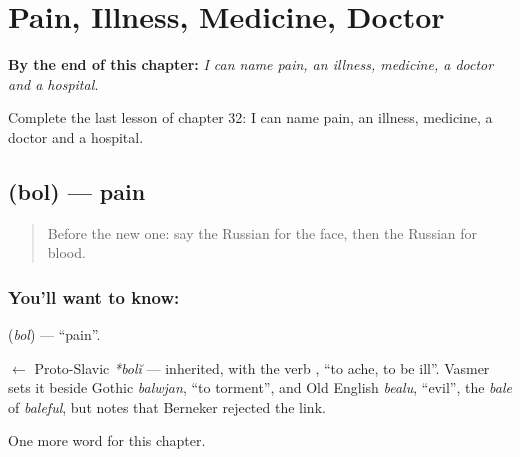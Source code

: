 
\chapter{Pain, Illness, Medicine, Doctor}
\label{ch:ru-pain-illness-medicine-doctor}

\begin{chapteropening}
\textbf{By the end of this chapter:} \emph{I can name pain, an illness, medicine, a doctor and a hospital.}

Complete the last lesson of chapter 32: I can name pain, an illness, medicine, a doctor and a hospital.
\end{chapteropening}

\section[\texorpdfstring{\ru{боль} (bol)}{боль (bol)}]{ (bol) — pain}

\label{lesson:RU-C32-pain}



\begin{quote}
Before the new one: say the Russian for the face, then the Russian for blood.
\end{quote}

\subsection*{You'll want to know: }
\textbf{} (\emph{bol}) — \textquotedblleft{}pain\textquotedblright{}.

\begin{cousinweb}
\textbf{} $\leftarrow$ Proto-Slavic \emph{*bolĭ} — inherited, with the verb \emph{}, \textquotedblleft{}to ache, to be ill\textquotedblright{}. Vasmer sets it beside Gothic \emph{balwjan}, \textquotedblleft{}to torment\textquotedblright{}, and Old English \emph{bealu}, \textquotedblleft{}evil\textquotedblright{}, the \emph{bale} of \emph{baleful}, but notes that Berneker rejected the link.
\end{cousinweb}

\begin{grammarlens}[title={What you've built}]
One more word for this chapter.
\end{grammarlens}

